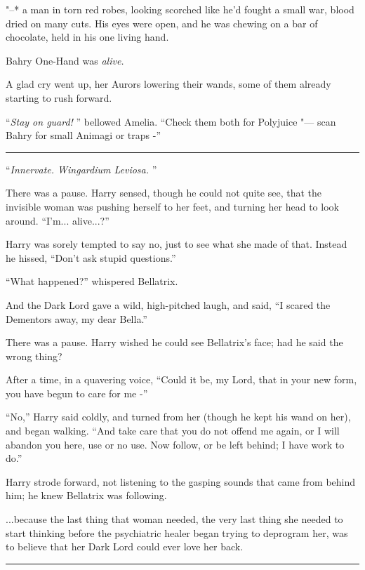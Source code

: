 "--* a man in torn red robes, looking scorched like he'd fought a small
war, blood dried on many cuts. His eyes were open, and he was chewing on
a bar of chocolate, held in his one living hand.

Bahry One-Hand was \emph{alive.}

A glad cry went up, her Aurors lowering their wands, some of them
already starting to rush forward.

``\emph{Stay on guard!} '' bellowed Amelia. ``Check them both for
Polyjuice "--- scan Bahry for small Animagi or traps -''

\begin{center}\rule{3in}{0.4pt}\end{center}

``\emph{Innervate. Wingardium Leviosa.} ''

There was a pause. Harry sensed, though he could not quite see, that the
invisible woman was pushing herself to her feet, and turning her head to
look around. ``I'm... alive...?''

Harry was sorely tempted to say no, just to see what she made of that.
Instead he hissed, ``Don't ask stupid questions.''

``What happened?'' whispered Bellatrix.

And the Dark Lord gave a wild, high-pitched laugh, and said, ``I scared
the Dementors away, my dear Bella.''

There was a pause. Harry wished he could see Bellatrix's face; had he
said the wrong thing?

After a time, in a quavering voice, ``Could it be, my Lord, that in your
new form, you have begun to care for me -''

``No,'' Harry said coldly, and turned from her (though he kept his wand
on her), and began walking. ``And take care that you do not offend me
again, or I will abandon you here, use or no use. Now follow, or be left
behind; I have work to do.''

Harry strode forward, not listening to the gasping sounds that came from
behind him; he knew Bellatrix was following.

...because the last thing that woman needed, the very last thing
she needed to start thinking before the psychiatric healer began trying
to deprogram her, was to believe that her Dark Lord could ever love her
back.

\begin{center}\rule{3in}{0.4pt}\end{center}

